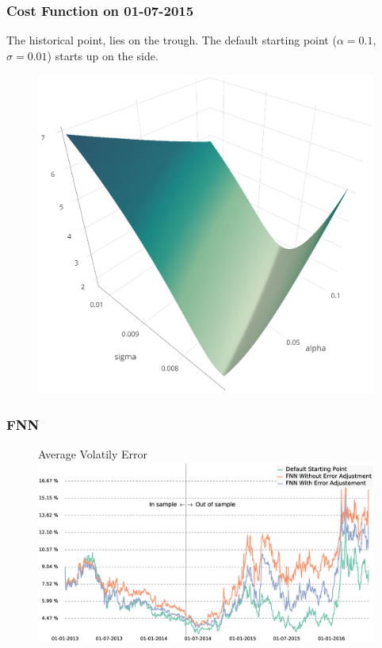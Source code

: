 \documentclass[bigger]{beamer}
\begin{document}
\begin{frame}
\frametitle{Cost Function on 01-07-2015}
  \justifying
 The historical point, lies on the trough. The default starting point ($\alpha=0.1$, $\sigma=0.01$) starts up on the side.
\begin{figure}[h]
\centering
    \includegraphics[width=\textwidth]{Graphics/surface.eps}
\end{figure}
\end{frame}

\begin{frame}
\frametitle{FNN}
  \justifying
\begin{figure}[h]
\centering
   Average Volatily Error\\
   \includegraphics[width=\textwidth]{Graphics/vola_error_fnn_unadj_vs_adj_error.eps}
\end{figure}
\end{frame}
\end{document}
